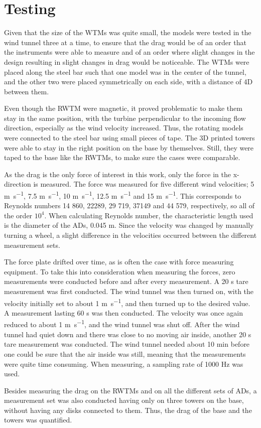 \section{Testing}
Given that the size of the \gls{WTM}s was quite small, the models were tested in the wind tunnel three at a time, to ensure that the drag would be of an order that the instruments were able to measure and of an order where slight changes in the design resulting in slight changes in drag would be noticeable. The \gls{WTM}s were placed  along the steel bar such that one model was in the center of the tunnel, and the other two were placed symmetrically on each side, with a distance of 4D between them.  %

Even though the \gls{RWTM} were magnetic, it proved problematic to make them stay in the same position, with the turbine perpendicular to the incoming flow direction, especially as the wind velocity increased. Thus, the rotating models were connected to the steel bar using small pieces of tape. The 3D printed towers were able to stay in the right position on the base by themselves. Still, they were taped to the base like the \gls{RWTM}s, to make sure the cases were comparable. 

As the drag is the only force of interest in this work, only the force in the x-direction is measured. The force was measured for five different wind velocities; 5 \si{\m\per\s}, 7.5 \si{\m\per\s}, 10 \si{\m\per\s}, 12.5 \si{\m\per\s} and 15 \si{\m\per\s}. This corresponds to Reynolds numbers 14 860, 22289, 29 719, 37149 and 44 579, respectively, so all of the order $10^4$. When calculating Reynolds number, the characteristic length used is the diameter of the \gls{AD}s, 0.045 \si{\m}. Since the velocity was changed by manually turning a wheel, a slight difference in the velocities occurred between the different measurement sets. 

The force plate drifted over time, as is often the case with force measuring equipment. To take this into consideration when measuring the forces, zero measurements were conducted before and after every measurement. A 20 \si{\s} tare measurement was first conducted. The wind tunnel was then turned on, with the velocity initially set to about 1 \si{\m\per\s}, and then turned up to the desired value. A measurement lasting 60 \si{s} was then conducted. The velocity was once again reduced to about 1 \si{\m\per\s}, and the wind tunnel was shut off. After the wind tunnel had quiet down and there was close to no moving air inside, another 20 \si{\s} tare measurement was conducted. The wind tunnel needed about 10 \si{\minute} before one could be sure that the air inside was still, meaning that the measurements were quite time consuming. When measuring, a sampling rate of 1000 \si{\hertz} was used.  

Besides measuring the drag on the \gls{RWTM}s and on all the different sets of \gls{AD}s, a measurement set was also conducted having only on three towers on the base, without having any disks connected to them. Thus, the drag of the base and the towers was quantified. 

